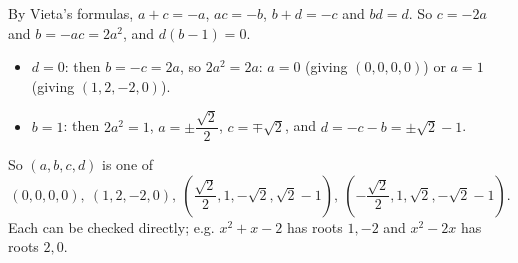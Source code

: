 By Vieta's formulas, $a+c=-a$, $ac=-b$, $b+d=-c$ and $bd=d$. So $c=-2a$ and $b=-ac=2a^2$, and $d(b-1)=0$.
\begin{itemize}
\item $d=0$: then $b=-c=2a$, so $2a^2=2a$: $a=0$ (giving $(0,0,0,0)$) or $a=1$ (giving $(1,2,-2,0)$).
\item $b=1$: then $2a^2=1$, $a=\pm\dfrac{\sqrt2}{2}$, $c=\mp\sqrt2$, and $d=-c-b=\pm\sqrt2-1$.
\end{itemize}
So $(a,b,c,d)$ is one of
\[\boxed{(0,0,0,0),\ (1,2,-2,0),\ \left(\dfrac{\sqrt2}{2},1,-\sqrt2,\sqrt2-1\right),\ \left(-\dfrac{\sqrt2}{2},1,\sqrt2,-\sqrt2-1\right)}.\]
Each can be checked directly; e.g. $x^2+x-2$ has roots $1,-2$ and $x^2-2x$ has roots $2,0$.
